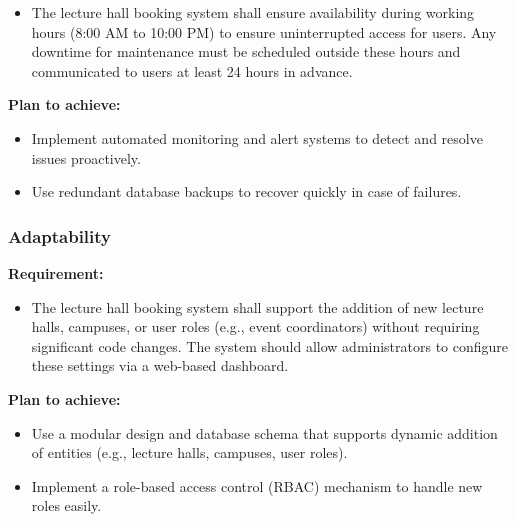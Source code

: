 \documentclass[a4paper,12pt]{article}
\begin{document}
\begin{itemize}
    \item The lecture hall booking system shall ensure availability during working hours (8:00 AM to 10:00 PM) to ensure uninterrupted access for users. Any downtime for maintenance must be scheduled outside these hours and communicated to users at least 24 hours in advance.
\end{itemize}

\textbf{Plan to achieve:}
\begin{itemize}
\begin{itemize}
\begin{itemize}
    \item Implement automated monitoring and alert systems to detect and resolve issues proactively.
    \item Use redundant database backups to recover quickly in case of failures.
\end{itemize}

\end{itemize}

\end{itemize}

\subsubsection{Adaptability}

\hspace{5mm}

\textbf{Requirement:} 
\begin{itemize}
    \item The lecture hall booking system shall support the addition of new lecture halls, campuses, or user roles (e.g., event coordinators) without requiring significant code changes. The system should allow administrators to configure these settings via a web-based dashboard.
\end{itemize}

\textbf{Plan to achieve:}
\begin{itemize}

\begin{itemize}

\begin{itemize}
    \item Use a modular design and database schema that supports dynamic addition of entities (e.g., lecture halls, campuses, user roles).
    \item Implement a role-based access control (RBAC) mechanism to handle new roles easily.
\end{itemize}

\end{itemize}
\end{itemize}
\end{document}
